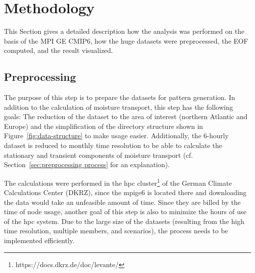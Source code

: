 \chapter{Methodology}
\label{ch:methodology}


%
This Section gives a detailed description how the analysis was performed on the basis of the MPI GE CMIP6, how the huge datasets were preprocessed, the EOF computed, and the result visualized. 

\section{Preprocessing}
\label{sec:preprocessing}

The purpose of this step is to prepare the datasets for pattern generation. In addition to the calculation of moisture transport, this step has the following goals: The reduction of the dataset to the area of interest (northern Atlantic and Europe) and the simplification of the directory structure shown in Figure~\ref{fig:data-structure} to make usage easier.
Additionally, the 6-hourly dataset is reduced to monthly time resolution to be able to calculate the stationary and transient components of moisture transport (cf. Section~\ref{sec:preprocessing process} for an explanation).

The calculations were performed in the \ac{hpc} cluster\footnote{https://docs.dkrz.de/doc/levante/} of the German Climate Calculations Center (DKRZ), since the \ac{mpige6} is located there and downloading the data would take an unfeasible amount of time. 
Since they are billed by the time of node usage, another goal of this step is also to minimize the hours of use of the \ac{hpc} system. 
Due to the large size of the datasets (resulting from the high time resolution, multiple members, and scenarios), the process needs to be implemented efficiently. 



